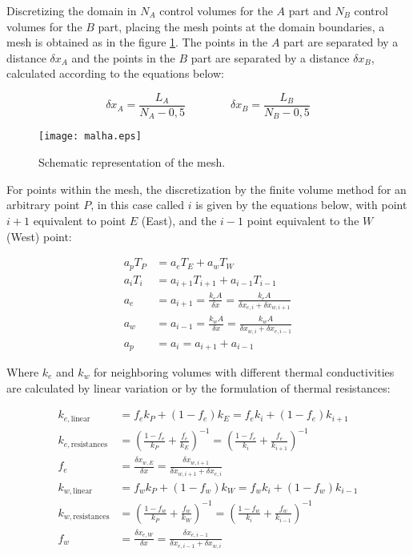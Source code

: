 Discretizing the domain in $N_A$ control volumes for the $A$ part and $N_B$ control volumes for the $B$ part, placing the mesh points at the domain boundaries, a mesh is obtained as in the figure \ref{fig:mesh}.
The points in the $A$ part are separated by a distance $\delta x_A$ and the points in the $B$ part are separated by a distance $\delta x_B$, calculated according to the equations below:

\begin{equation*}
    \delta x_A = \frac{L_A}{N_A - 0,5} \qquad\qquad \delta x_B = \frac{L_B}{N_B - 0,5}
\end{equation*}

\begin{figure}[h]
    \centering
    \texttt{[image: malha.eps]}
    \caption{Schematic representation of the mesh.}
    \label{fig:mesh}
\end{figure}

For points within the mesh, the discretization by the finite volume method for an arbitrary point $P$, in this case called $i$ is given by the equations below, with point $i + 1$ equivalent to point $E$ (East), and the $i-1$ point equivalent to the $W$ (West) point:

\begin{align*}
    a_p T_P &= a_e T_E + a_w T_W \\
    a_i T_i &= a_{i+1} T_{i+1} + a_{i-1} T_{i-1} \\
    a_e &= a_{i+1} = \frac{k_e A}{\delta x} = \frac{k_e A}{\delta x_{e,i} + \delta x_{w,i+1}} \\
    a_w &= a_{i-1} = \frac{k_w A}{\delta x} = \frac{k_w A}{\delta x_{w,i} + \delta x_{e,i-1}}\\
    a_p &= a_i = a_{i+1} + a_{i-1}
\end{align*}

Where $k_e$ and $k_w$ for neighboring volumes with different thermal conductivities are calculated by linear variation or by the formulation of thermal resistances:

\begin{align*}
    k_{e, \text{linear}} &= f_e k_P + (1 - f_e) k_E = f_e k_i + (1 - f_e) k_{i+1} \\
    k_{e, \text{resistances}} &= \left(\frac{1 - f_e}{k_P} + \frac{f_e}{k_E} \right)^{-1} = \left(\frac{1 - f_e}{k_i} + \frac{f_e}{k_{i+1}} \right)^{-1} \\
    f_e &= \frac{\delta x_{w,E}}{\delta x} = \frac{\delta x_{w,i+1}}{\delta x_{w,i+1} + \delta x_{e,i}} \\
    k_{w, \text{linear}} &= f_w k_P + (1 - f_w) k_W = f_w k_i + (1 - f_w) k_{i-1} \\
    k_{w, \text{resistances}} &= \left(\frac{1 - f_w}{k_P} + \frac{f_w}{k_W} \right)^{-1} = \left(\frac{1 - f_w}{k_i} + \frac{f_w}{k_{i-1}} \right)^{-1} \\
    f_w &= \frac{\delta x_{e,W}}{\delta x} = \frac{\delta x_{e,i-1}}{\delta x_{e,i-1} + \delta x_{w,i}}
\end{align*}

